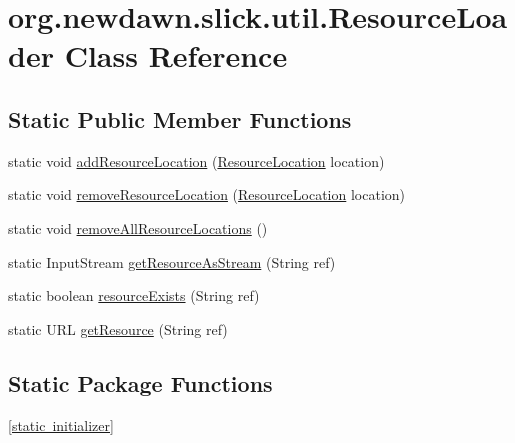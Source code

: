 \hypertarget{classorg_1_1newdawn_1_1slick_1_1util_1_1_resource_loader}{}\section{org.\+newdawn.\+slick.\+util.\+Resource\+Loader Class Reference}
\label{classorg_1_1newdawn_1_1slick_1_1util_1_1_resource_loader}
\subsection*{Static Public Member Functions}
\begin{DoxyCompactItemize}
\item 
static void \mbox{\hyperlink{classorg_1_1newdawn_1_1slick_1_1util_1_1_resource_loader_a815e892adea09dcf67cdd3d4e5181b48}{add\+Resource\+Location}} (\mbox{\hyperlink{interfaceorg_1_1newdawn_1_1slick_1_1util_1_1_resource_location}{Resource\+Location}} location)
\item 
static void \mbox{\hyperlink{classorg_1_1newdawn_1_1slick_1_1util_1_1_resource_loader_a07baccb0f4cbd257770ca4d106deef29}{remove\+Resource\+Location}} (\mbox{\hyperlink{interfaceorg_1_1newdawn_1_1slick_1_1util_1_1_resource_location}{Resource\+Location}} location)
\item 
static void \mbox{\hyperlink{classorg_1_1newdawn_1_1slick_1_1util_1_1_resource_loader_a36594e1392cd15e9c73702a2f8dd9b95}{remove\+All\+Resource\+Locations}} ()
\item 
static Input\+Stream \mbox{\hyperlink{classorg_1_1newdawn_1_1slick_1_1util_1_1_resource_loader_a7c561d9392956ba94e86a1d7a92031ce}{get\+Resource\+As\+Stream}} (String ref)
\item 
static boolean \mbox{\hyperlink{classorg_1_1newdawn_1_1slick_1_1util_1_1_resource_loader_a606918828f55d8ed9c16ead437b719fb}{resource\+Exists}} (String ref)
\item 
static U\+RL \mbox{\hyperlink{classorg_1_1newdawn_1_1slick_1_1util_1_1_resource_loader_a5745e07c111bca745914cd4fd5a4929d}{get\+Resource}} (String ref)
\end{DoxyCompactItemize}
\subsection*{Static Package Functions}
\begin{DoxyCompactItemize}
\item 
\mbox{\hyperlink{classorg_1_1newdawn_1_1slick_1_1util_1_1_resource_loader_a7f3e3e593461bc5c0aceeb00e08650dc}{\mbox{[}static initializer\mbox{]}}}
\end{DoxyCompactItemize}

